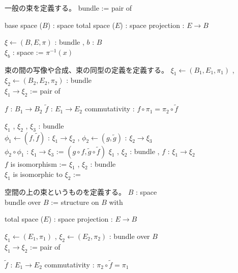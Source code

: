 \begin{Definition}
\itemnote
  一般の束を定義する。
\itemdefi
  \Define bundle := pair of
  \begin{itemize}
    \itemenum base space (\(B\)) : space
    \itemenum total space (\(E\)) : space
    \itemenum projection : \(E \to B\)
  \end{itemize}
\itemdefi
  \For \(\xi \leftarrow (B , E , \pi)\) : bundle , \(b\) : \(B\) \\
  \Define \(\xi_b\) : space := \(\pi^{-1}(x)\)
\end{Definition}

\begin{Definition}
\itemnote
  束の間の写像や合成、束の同型の定義を定義する。
\itemdefi
  \For \(\xi_1 \leftarrow (B_1 , E_1 , \pi_1)\) , \(\xi_2 \leftarrow (B_2 , E_2 , \pi_2)\) : bundle \\
  \Define \(\xi_1 \to \xi_2\) := pair of
  \begin{itemize}
    \itemenum \(f\) : \(B_1 \to B_2\)
    \itemenum \(\tilde{f}\) : \(E_1 \to E_2\)
    \itemwith commutativity : \(f \circ \pi_1 = \pi_2 \circ \tilde{f}\)
  \end{itemize}
\itemdefi
  \For \(\xi_1\) , \(\xi_2\) , \(\xi_3\) : bundle \\
  \For \(\phi_1 \leftarrow (f , \tilde{f})\) : \(\xi_1 \to \xi_2\) , \(\phi_2 \leftarrow (g , \tilde{g})\) : \(\xi_2 \to \xi_3\) \\
  \Define \(\phi_2 \circ \phi_1\) : \(\xi_1 \to \xi_3\) := \((g \circ f , \tilde{g} \circ \tilde{f})\)
\itemdefi
  \For \(\xi_1\) , \(\xi_2\) : bundle , \(f\) : \(\xi_1 \to \xi_2\) \\
  \Define \(f\) is isomorphism := 
\itemdefi
  \For \(\xi_1\) , \(\xi_2\) : bundle \\
  \Define \(\xi_1\) is isomorphic to \(\xi_2\) := 
\end{Definition}

\begin{Definition}
\itemnote
  空間の上の束というものを定義する。
\itemdefi
  \For \(B\) : space \\
  \Define bundle over \(B\) := structure on \(B\) with
  \begin{itemize}
    \itemenum total space (\(E\)) : space
    \itemenum projection : \(E \to B\)
  \end{itemize}
\itemdefi
  \For \(\xi_1 \leftarrow (E_1 , \pi_1)\) , \(\xi_2 \leftarrow (E_2 , \pi_2)\) : bundle over \(B\) \\
  \Define \(\xi_1 \to \xi_2\) := pair of
  \begin{itemize}
    \itemenum \(\tilde{f}\) : \(E_1 \to E_2\)
    \itemwith commutativity : \(\pi_2 \circ \tilde{f} = \pi_1\)
  \end{itemize}
\end{Definition}

